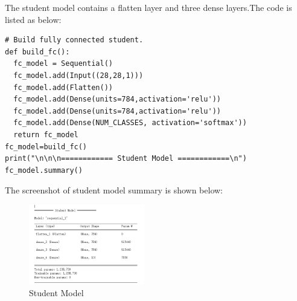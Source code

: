\documentclass[conference]{IEEEtran}
\begin{document}
The student model contains a flatten layer and three dense layers.The code is listed as below:
\begin{lstlisting}
# Build fully connected student.
def build_fc():
  fc_model = Sequential()
  fc_model.add(Input((28,28,1)))
  fc_model.add(Flatten())
  fc_model.add(Dense(units=784,activation='relu'))
  fc_model.add(Dense(units=784,activation='relu'))
  fc_model.add(Dense(NUM_CLASSES, activation='softmax'))
  return fc_model
fc_model=build_fc()
print("\n\n\n============ Student Model ============\n")
fc_model.summary()
\end{lstlisting} \par
The screenshot of student model summary is shown below:
\begin{figure}[h] 
    \centering
    \includegraphics[width=0.45\textwidth]{./graphs/Student_MNIST.png}
    \caption{Student Model}
    \label{Fig.t1q3e}
\end{figure}
\end{document}
